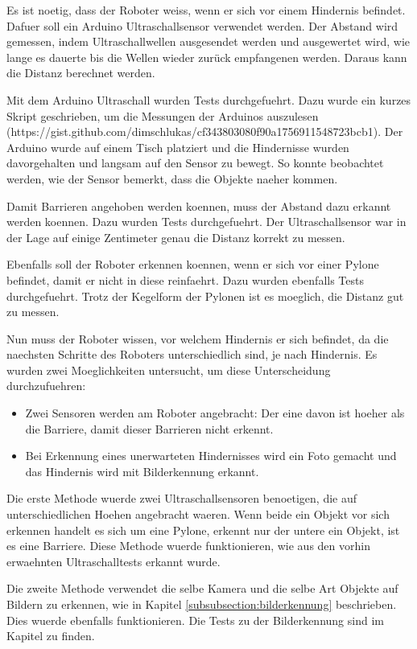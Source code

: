 Es ist noetig, dass der Roboter weiss, wenn er sich vor einem Hindernis befindet. Dafuer soll ein Arduino Ultraschallsensor verwendet werden. Der Abstand wird gemessen, indem Ultraschallwellen ausgesendet werden und ausgewertet wird, wie lange es dauerte bis die Wellen wieder zurück empfangenen werden. Daraus kann die Distanz berechnet werden.

Mit dem Arduino Ultraschall wurden Tests durchgefuehrt. Dazu wurde ein kurzes Skript geschrieben, um die Messungen der Arduinos auszulesen (https://gist.github.com/dimschlukas/cf343803080f90a1756911548723bcb1). Der Arduino wurde auf einem Tisch platziert und die Hindernisse wurden davorgehalten und langsam auf den Sensor zu bewegt. So konnte beobachtet werden, wie der Sensor bemerkt, dass die Objekte naeher kommen.

Damit Barrieren angehoben werden koennen, muss der Abstand dazu erkannt werden koennen. Dazu wurden Tests durchgefuehrt. Der Ultraschallsensor war in der Lage auf einige Zentimeter genau die Distanz korrekt zu messen.

Ebenfalls soll der Roboter erkennen koennen, wenn er sich vor einer Pylone befindet, damit er nicht in diese reinfaehrt. Dazu wurden ebenfalls Tests durchgefuehrt. Trotz der Kegelform der Pylonen ist es moeglich, die Distanz gut zu messen.

Nun muss der Roboter wissen, vor welchem Hindernis er sich befindet, da die naechsten Schritte des Roboters unterschiedlich sind, je nach Hindernis. Es wurden zwei Moeglichkeiten untersucht, um diese Unterscheidung durchzufuehren:

\begin{itemize}
    \item Zwei Sensoren werden am Roboter angebracht: Der eine davon ist hoeher als die Barriere, damit dieser Barrieren nicht erkennt.
    \item Bei Erkennung eines unerwarteten Hindernisses wird ein Foto gemacht und das Hindernis wird mit Bilderkennung erkannt.
\end{itemize}

Die erste Methode wuerde zwei Ultraschallsensoren benoetigen, die auf unterschiedlichen Hoehen angebracht waeren. Wenn beide ein Objekt vor sich erkennen handelt es sich um eine Pylone, erkennt nur der untere ein Objekt, ist es eine Barriere. Diese Methode wuerde funktionieren, wie aus den vorhin erwaehnten Ultraschalltests erkannt wurde.

Die zweite Methode verwendet die selbe Kamera und die selbe Art Objekte auf Bildern zu erkennen, wie in Kapitel \ref{subsubsection:bilderkennung} beschrieben. Dies wuerde ebenfalls funktionieren. Die Tests zu der Bilderkennung sind im Kapitel  zu finden.

